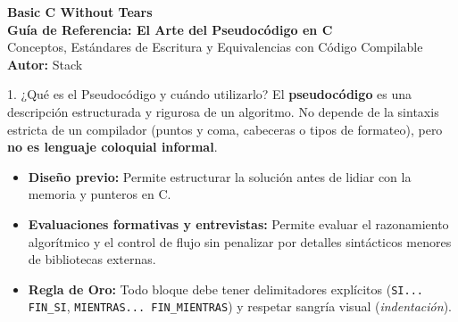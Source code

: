 \documentclass[11pt,letterpaper]{article}
\begin{document}
\begin{center}
    {\LARGE \textbf{Basic C Without Tears}} \\[0.2cm]
    {\Large \textbf{Guía de Referencia: El Arte del Pseudocódigo en C}} \\[0.1cm]
    \small Conceptos, Estándares de Escritura y Equivalencias con Código Compilable \\[0.05cm]
    \textbf{Autor:} Stack
\end{center}

\vspace{0.1cm}

\begin{conceptbox}{1. ¿Qué es el Pseudocódigo y cuándo utilizarlo?}
\small
El \textbf{pseudocódigo} es una descripción estructurada y rigurosa de un algoritmo. No depende de la sintaxis estricta de un compilador (puntos y coma, cabeceras o tipos de formateo), pero \textbf{no es lenguaje coloquial informal}.
\begin{itemize}[noitemsep, topsep=1pt]
    \item \textbf{Diseño previo:} Permite estructurar la solución antes de lidiar con la memoria y punteros en C.
    \item \textbf{Evaluaciones formativas y entrevistas:} Permite evaluar el razonamiento algorítmico y el control de flujo sin penalizar por detalles sintácticos menores de bibliotecas externas.
    \item \textbf{Regla de Oro:} Todo bloque debe tener delimitadores explícitos (\texttt{SI... FIN\_SI}, \texttt{MIENTRAS... FIN\_MIENTRAS}) y respetar sangría visual (\textit{indentación}).
\end{itemize}
\end{conceptbox}

\vspace{0.15cm}
\end{document}
